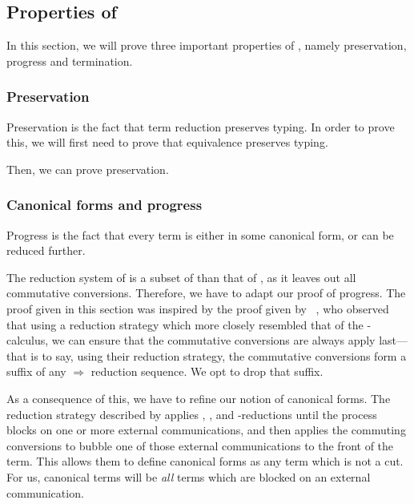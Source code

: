 \subsection{Properties of \rcp}\label{sec:cp-properties}
In this section, we will prove three important properties of \rcp, namely
preservation, progress and termination.

\subsubsection{Preservation}
Preservation is the fact that term reduction preserves typing. In order to prove
this, we will first need to prove that equivalence preserves typing.


Then, we can prove preservation.



\subsubsection{Canonical forms and progress}
Progress is the fact that every term is either in some canonical form, or can be
reduced further.

The reduction system of \rcp is a subset of than that of \cp, as it leaves out
all commutative conversions. Therefore, we have to adapt our proof of progress.
The proof given in this section was inspired by the proof given by
\citeauthor{lindley2015semantics}~\cite{lindley2015semantics}, who observed that
using a reduction strategy which more closely resembled that of the
\textpi-calculus, we can ensure that the commutative conversions are always
apply last---that is to say, using their reduction strategy, the commutative
conversions form a suffix of any $\Longrightarrow$ reduction sequence.
We opt to drop that suffix.

As a consequence of this, we have to refine our notion of canonical forms.
The reduction strategy described by \citeauthor{lindley2015semantics} applies
, , and \textbeta-reductions until the process blocks on
one or more external communications, and then applies the commuting conversions
to bubble one of those external communications to the front of the term.
This allows them to define canonical forms as any term which is not a cut.
For us, canonical terms will be \emph{all} terms which are blocked on an
external communication. 


